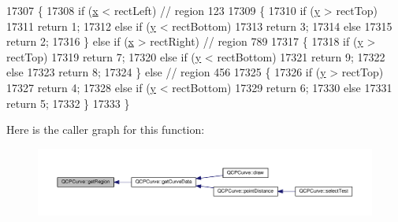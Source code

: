 \begin{DoxyCode}
17307 \{
17308   \textcolor{keywordflow}{if} (\hyperlink{_comparision_pictures_2_createtest_image_8m_a9336ebf25087d91c818ee6e9ec29f8c1}{x} < rectLeft) \textcolor{comment}{// region 123}
17309   \{
17310     \textcolor{keywordflow}{if} (\hyperlink{_comparision_pictures_2_createtest_image_8m_a2fb1c5cf58867b5bbc9a1b145a86f3a0}{y} > rectTop)
17311       \textcolor{keywordflow}{return} 1;
17312     \textcolor{keywordflow}{else} \textcolor{keywordflow}{if} (\hyperlink{_comparision_pictures_2_createtest_image_8m_a2fb1c5cf58867b5bbc9a1b145a86f3a0}{y} < rectBottom)
17313       \textcolor{keywordflow}{return} 3;
17314     \textcolor{keywordflow}{else}
17315       \textcolor{keywordflow}{return} 2;
17316   \} \textcolor{keywordflow}{else} \textcolor{keywordflow}{if} (\hyperlink{_comparision_pictures_2_createtest_image_8m_a9336ebf25087d91c818ee6e9ec29f8c1}{x} > rectRight) \textcolor{comment}{// region 789}
17317   \{
17318     \textcolor{keywordflow}{if} (\hyperlink{_comparision_pictures_2_createtest_image_8m_a2fb1c5cf58867b5bbc9a1b145a86f3a0}{y} > rectTop)
17319       \textcolor{keywordflow}{return} 7;
17320     \textcolor{keywordflow}{else} \textcolor{keywordflow}{if} (\hyperlink{_comparision_pictures_2_createtest_image_8m_a2fb1c5cf58867b5bbc9a1b145a86f3a0}{y} < rectBottom)
17321       \textcolor{keywordflow}{return} 9;
17322     \textcolor{keywordflow}{else}
17323       \textcolor{keywordflow}{return} 8;
17324   \} \textcolor{keywordflow}{else} \textcolor{comment}{// region 456}
17325   \{
17326     \textcolor{keywordflow}{if} (\hyperlink{_comparision_pictures_2_createtest_image_8m_a2fb1c5cf58867b5bbc9a1b145a86f3a0}{y} > rectTop)
17327       \textcolor{keywordflow}{return} 4;
17328     \textcolor{keywordflow}{else} \textcolor{keywordflow}{if} (\hyperlink{_comparision_pictures_2_createtest_image_8m_a2fb1c5cf58867b5bbc9a1b145a86f3a0}{y} < rectBottom)
17329       \textcolor{keywordflow}{return} 6;
17330     \textcolor{keywordflow}{else}
17331       \textcolor{keywordflow}{return} 5;
17332   \}
17333 \}
\end{DoxyCode}


Here is the caller graph for this function\+:\nopagebreak
\begin{figure}[H]
\begin{center}
\leavevmode
\includegraphics[width=350pt]{class_q_c_p_curve_a3af3183f35bd7aebe149f29ae4f1034a_icgraph}
\end{center}
\end{figure}


